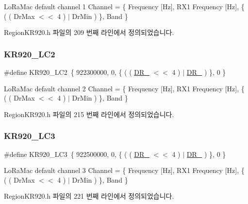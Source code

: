 Lo\+Ra\+Mac default channel 1 Channel = \{ Frequency \mbox{[}Hz\mbox{]}, R\+X1 Frequency \mbox{[}Hz\mbox{]}, \{ ( ( Dr\+Max $<$$<$ 4 ) $\vert$ Dr\+Min ) \}, Band \} 

Region\+K\+R920.\+h 파일의 209 번째 라인에서 정의되었습니다.

\mbox{\label{group___r_e_g_i_o_n_k_r920_ga1253892583b3997c9fd45c2a0934fa78}} 
\subsubsection{\texorpdfstring{K\+R920\+\_\+\+L\+C2}{KR920\_LC2}}
{\footnotesize\ttfamily \#define K\+R920\+\_\+\+L\+C2~\{ 922300000, 0, \{ ( ( \mbox{\hyperlink{group___r_e_g_i_o_n_ga872e12c82020c02a7f70a1c6ed1375df}{D\+R\+\_}} $<$$<$ 4 ) $\vert$ \mbox{\hyperlink{group___r_e_g_i_o_n_ga6c4ef966b4f3d5eb7597b087f2b97095}{D\+R\+\_}} ) \}, 0 \}}

Lo\+Ra\+Mac default channel 2 Channel = \{ Frequency \mbox{[}Hz\mbox{]}, R\+X1 Frequency \mbox{[}Hz\mbox{]}, \{ ( ( Dr\+Max $<$$<$ 4 ) $\vert$ Dr\+Min ) \}, Band \} 

Region\+K\+R920.\+h 파일의 215 번째 라인에서 정의되었습니다.

\mbox{\label{group___r_e_g_i_o_n_k_r920_gac8d050d9705d659f5b5977beaf53f5a0}} 
\subsubsection{\texorpdfstring{K\+R920\+\_\+\+L\+C3}{KR920\_LC3}}
{\footnotesize\ttfamily \#define K\+R920\+\_\+\+L\+C3~\{ 922500000, 0, \{ ( ( \mbox{\hyperlink{group___r_e_g_i_o_n_ga872e12c82020c02a7f70a1c6ed1375df}{D\+R\+\_}} $<$$<$ 4 ) $\vert$ \mbox{\hyperlink{group___r_e_g_i_o_n_ga6c4ef966b4f3d5eb7597b087f2b97095}{D\+R\+\_}} ) \}, 0 \}}

Lo\+Ra\+Mac default channel 3 Channel = \{ Frequency \mbox{[}Hz\mbox{]}, R\+X1 Frequency \mbox{[}Hz\mbox{]}, \{ ( ( Dr\+Max $<$$<$ 4 ) $\vert$ Dr\+Min ) \}, Band \} 

Region\+K\+R920.\+h 파일의 221 번째 라인에서 정의되었습니다.


